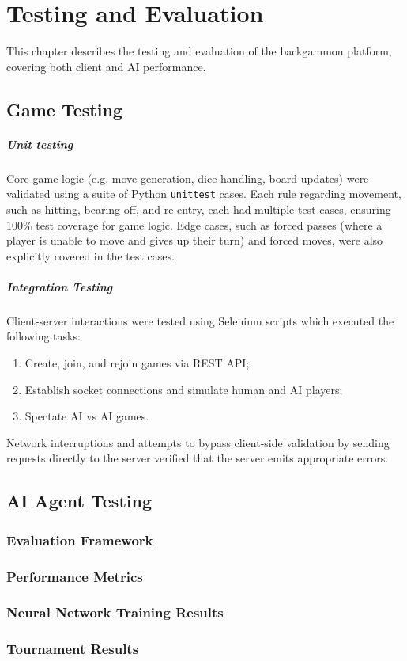 



\chapter{Testing and Evaluation}
This chapter describes the testing and evaluation of the backgammon platform, covering both client and AI performance.
\section{Game Testing}
\paragraph{Unit testing}
Core game logic (e.g. move generation, dice handling, board updates) were validated using a suite of Python \texttt{unittest} cases. 
Each rule regarding movement, such as hitting, bearing off, and re-entry, each had multiple test cases, ensuring 100\% test coverage for game logic. 
Edge cases, such as forced passes (where a player is unable to move and gives up their turn) and forced moves, were also explicitly covered in the test cases.

\paragraph{Integration Testing}
Client-server interactions were tested using Selenium scripts which executed the following tasks:
\begin{enumerate}
    \item Create, join, and rejoin games via REST API;
    \item Establish socket connections and simulate human and AI players;
    \item Spectate AI vs AI games.
\end{enumerate}
Network interruptions and attempts to bypass client-side validation by sending requests directly to the server verified that the server emits appropriate errors.




\section{AI Agent Testing}
\subsection{Evaluation Framework}
\subsection{Performance Metrics}
\subsection{Neural Network Training Results}
\subsection{Tournament Results}
